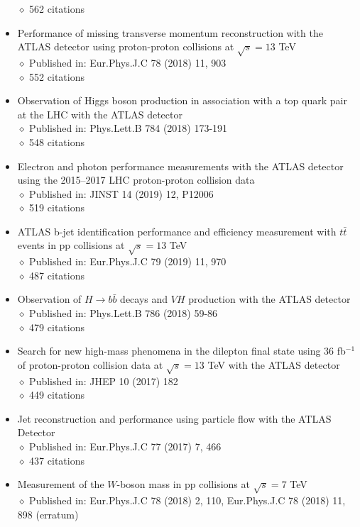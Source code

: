 \documentclass[margin, 10pt]{res} %
\begin{document}
\begin{resume}
\begin{itemize}
$\diamond$ 562 citations
\item Performance of missing transverse momentum reconstruction with the ATLAS detector using proton-proton collisions at $\sqrt{s} = 13$ TeV\\
$\diamond$ Published in: Eur.Phys.J.C 78 (2018) 11, 903\\
$\diamond$ 552 citations
\item Observation of Higgs boson production in association with a top quark pair at the LHC with the ATLAS detector\\
$\diamond$ Published in: Phys.Lett.B 784 (2018) 173-191\\
$\diamond$ 548 citations
\item Electron and photon performance measurements with the ATLAS detector using the 2015–2017 LHC proton-proton collision data\\
$\diamond$ Published in: JINST 14 (2019) 12, P12006\\
$\diamond$ 519 citations
\item ATLAS b-jet identification performance and efficiency measurement with $t\bar{t}$ events in pp collisions at $\sqrt{s} = 13$ TeV\\
$\diamond$ Published in: Eur.Phys.J.C 79 (2019) 11, 970\\
$\diamond$ 487 citations
\item Observation of $H\rightarrow b\bar{b}$ decays and $VH$ production with the ATLAS detector\\
$\diamond$ Published in: Phys.Lett.B 786 (2018) 59-86\\
$\diamond$ 479 citations
\item Search for new high-mass phenomena in the dilepton final state using 36 fb$^{-1}$ of proton-proton collision data at $\sqrt{s} = 13$ TeV with the ATLAS detector\\
$\diamond$ Published in: JHEP 10 (2017) 182\\
$\diamond$ 449 citations
\item Jet reconstruction and performance using particle flow with the ATLAS Detector\\
$\diamond$ Published in: Eur.Phys.J.C 77 (2017) 7, 466\\
$\diamond$ 437 citations
\item Measurement of the $W$-boson mass in pp collisions at $\sqrt{s} = 7$ TeV\\
$\diamond$ Published in: Eur.Phys.J.C 78 (2018) 2, 110, Eur.Phys.J.C 78 (2018) 11, 898 (erratum)\\

\end{itemize}
\end{resume}
\end{document}
